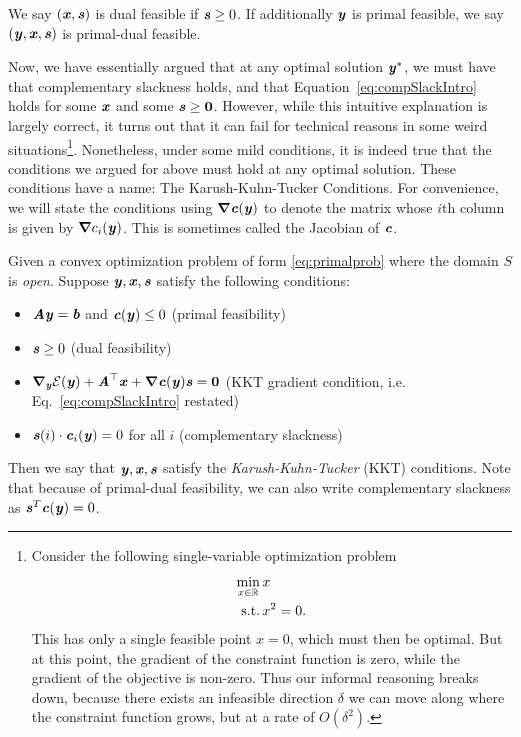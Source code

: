 \begin{definition}
We say $(\xx, \ss)$ is dual feasible if $\ss \geq 0$.
If additionally $\yy$ is primal feasible, we say $(\yy, \xx, \ss)$ is primal-dual feasible.
\end{definition}

Now, we have essentially argued that at any optimal solution
$\yy^*$, we must have that complementary slackness holds, and that
Equation~\eqref{eq:compSlackIntro} holds for some $\xx$ and some $\ss
\geq \veczero$.
However, while this intuitive explanation is largely correct, it turns
out that it can fail for technical reasons in some weird
situations\footnote{
  Consider the following single-variable optimization problem
  \begin{align*}
    \min_{x
    \in \R} &\, x
    \\
    \text{s.t.} & \, x^2 = 0.
  \end{align*}
  This has only a single feasible point $x = 0$, which must then be
  optimal.
  But at this point, the gradient of the constraint function is zero,
  while the gradient of the objective is non-zero.
  Thus our informal reasoning breaks down, because there exists an infeasible
  direction $\delta$ we can move along where the constraint function grows, but
  at a rate of $O(\delta^2)$.
  }.
Nonetheless, under some mild conditions, it is indeed true that the 
conditions we argued for above must hold at any optimal solution.
These conditions have a name: The Karush-Kuhn-Tucker Conditions.
For convenience, we will state the conditions using $\grad \cc(\yy)$
to denote the matrix whose $i$th column is given by $\grad c_i(\yy)$.
This is sometimes called the Jacobian of $\cc$.

\begin{definition}
  Given a convex optimization problem of form
  \eqref{eq:primalprob} where the domain $S$ is \emph{open}.
  Suppose $\yy, \xx, \ss$ satisfy the following conditions:
  \begin{itemize}
  \item $\AA\yy = \bb$ and $\cc(\yy) \leq 0$ \hfill (primal feasibility)
  \item $\ss \geq 0$ \hfill (dual feasibility)
  \item $\grad_{\yy}\calE(\yy) + \AA^\trp\xx +
    \grad\cc(\yy) \ss = \matzero$ \hfill
    (KKT gradient condition, i.e. Eq.~\eqref{eq:compSlackIntro} restated)
  \item $\ss(i)\cdot\cc_i(\yy) = 0$ for all $i$ \hfill (complementary slackness)
  \end{itemize}
  Then we say that $\yy, \xx, \ss$ satisfy the
  \emph{Karush-Kuhn-Tucker} (KKT) conditions.
  Note that because of primal-dual feasibility, we can also write
  complementary slackness as  $\ss^T \cc(\yy)= 0$.
\end{definition}

